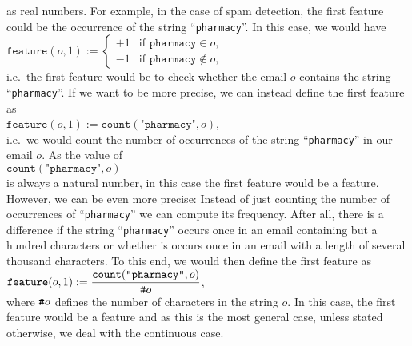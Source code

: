 as real numbers.  For example, in the case of spam detection, the first feature
could be the occurrence of the string ``\texttt{pharmacy}''.  In this case, we would have
\\[0.2cm]
\hspace*{1.3cm}
$\texttt{feature}(o, 1) := \left\{
\begin{array}{ll}
  +1 & \mbox{if \ $\texttt{pharmacy}     \in o$,}      \\
  -1 & \mbox{if \ $\texttt{pharmacy} \not\in o$,}  
\end{array}\right.
$
\\[0.2cm]
i.e.~the first feature would be to check whether the email $o$ contains the string ``\texttt{pharmacy}''.  
If we want to be more precise, we can instead define the first feature as
\\[0.2cm]
\hspace*{1.3cm}
$\texttt{feature}(o, 1) := \mathtt{count}(\texttt{"pharmacy"}, o)$,
\\[0.2cm]
i.e.~we would count the number of occurrences of the string ``\texttt{pharmacy}'' in our email $o$.   
As the value of
\\[0.2cm]
\hspace*{1.3cm}
 $\mathtt{count}(\texttt{"pharmacy"}, o)$ 
\\[0.2cm]
is always a natural number, in this case the first feature would be a
  feature.  However, we can be even more precise: Instead of just counting the number of occurrences of
 ``\texttt{pharmacy}'' we can compute its frequency.  After all, there is a difference if the string ``\texttt{pharmacy}'' occurs once in an email
 containing but a hundred characters or whether is occurs once in an email with a length of several thousand
 characters.  To this end, we would then define the first feature as
\\[0.2cm]
\hspace*{1.3cm}
$\displaystyle \texttt{feature}(o, 1) := \frac{\mathtt{count}(\texttt{"pharmacy"}, o)}{\texttt{\#} o}$, 
\\[0.2cm]
where $\texttt{\#} o$ defines the number of characters in the string $o$.  In this case, the first feature would be a
 feature and as this is the most general case, unless stated otherwise, we deal with the continuous
case. 

